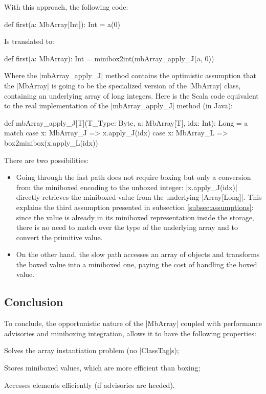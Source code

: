 With this approach, the following code:

\begin{lstlisting-nobreak}
 def first(a: MbArray[Int]): Int = a(0)
\end{lstlisting-nobreak}

Is translated to:

\begin{lstlisting-nobreak}
 def first(a: MbArray): Int =
   minibox2int(mbArray_apply_J(a, 0))
\end{lstlisting-nobreak}

Where the |mbArray_apply_J| method contains the optimistic assumption that the |MbArray| is going to be the specialized version of the |MbArray| class, containing an underlying array of long integers. Here is the Scala code equivalent to the real implementation of the |mbArray_apply_J| method (in Java):

\begin{lstlisting-nobreak}
 def mbArray_apply_J[T](T_Type: Byte, a: MbArray[T], idx: Int): Long =
   a match {
     case x: MbArray_J => x.apply_J(idx)
     case x: MbArray_L => box2minibox(x.apply_L(idx))
   }
\end{lstlisting-nobreak}

There are two possibilities:
\begin{itemize}
  \item Going through the fast path does not require boxing but only a conversion from the miniboxed encoding to the unboxed integer: |x.apply_J(idx)| directly retrieves the miniboxed value from the underlying |Array[Long]|. This explains the third assumption presented in subsection \ref{subsec:assumptions}: since the value is already in its miniboxed representation inside the storage, there is no need to match over the type of the underlying array and to convert the primitive value.
  \item On the other hand, the slow path accesses an array of objects and transforms the boxed value into a miniboxed one, paying the cost of handling the boxed value.
\end{itemize} 

\subsection{Conclusion}


To conclude, the opportunistic nature of the |MbArray| coupled with performance advisories and miniboxing integration, allows it to have the following properties:
\begin{compactitem}
  \item Solves the array instantiation problem (no |ClassTag|s);
  \item Stores miniboxed values, which are more efficient than boxing;
  \item Accesses elements efficiently (if advisories are heeded).
\end{compactitem}

